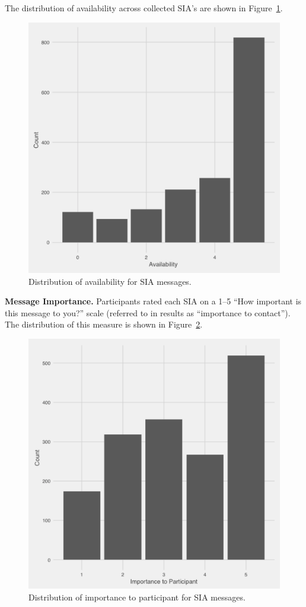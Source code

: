 \documentclass[12pt]{nuthesis}	%
\begin{document}
The distribution of availability across collected SIA's are shown in Figure~\ref{fig:availability_distribution}.

\begin{figure}[h]
\centering
\includegraphics[width=.7\textwidth]{figures/availability_distribution}
\caption{Distribution of availability for SIA messages.}
\label{fig:availability_distribution}
\end{figure}


\textbf{Message Importance.} Participants rated each SIA on a 1--5 ``How important is this message to you?'' scale (referred to in results as ``importance to contact''). The distribution of this measure is shown in Figure~\ref{fig:importance_distribution}.

\begin{figure}[h]
\centering
\includegraphics[width=.7\textwidth]{figures/importance_distribution}
\caption{Distribution of importance to participant for SIA messages.}
\label{fig:importance_distribution}
\end{figure}
\end{document}

